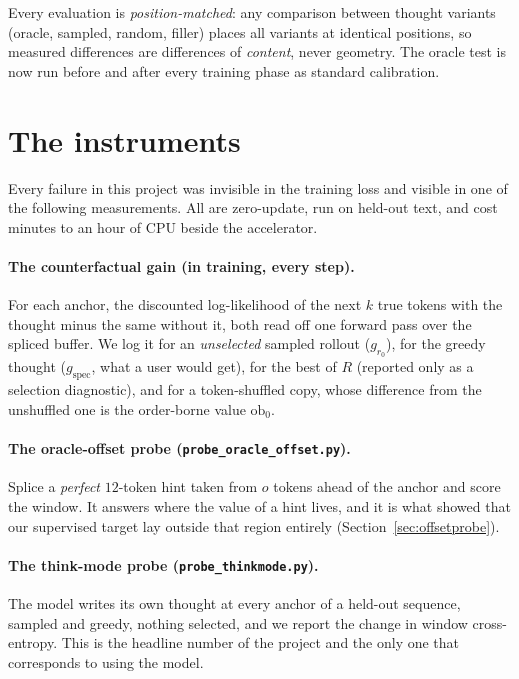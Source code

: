 \documentclass{article} %
\begin{document}
Every evaluation is \emph{position-matched}: any comparison between thought variants (oracle, sampled, random, filler) places all variants at identical positions, so measured differences are differences of \emph{content}, never geometry. The oracle test is now run before and after every training phase as standard calibration.

\section{The instruments}
\label{sec:instruments}

Every failure in this project was invisible in the training loss and visible in one of the following measurements. All are zero-update, run on held-out text, and cost minutes to an hour of CPU beside the accelerator.

\paragraph{The counterfactual gain (in training, every step).} For each anchor, the discounted log-likelihood of the next $k$ true tokens with the thought minus the same without it, both read off one forward pass over the spliced buffer. We log it for an \emph{unselected} sampled rollout ($g_{r_0}$), for the greedy thought ($g_{\mathrm{spec}}$, what a user would get), for the best of $R$ (reported only as a selection diagnostic), and for a token-shuffled copy, whose difference from the unshuffled one is the order-borne value $\mathrm{ob}_0$.

\paragraph{The oracle-offset probe (\texttt{probe\_oracle\_offset.py}).} Splice a \emph{perfect} $12$-token hint taken from $o$ tokens ahead of the anchor and score the window. It answers where the value of a hint lives, and it is what showed that our supervised target lay outside that region entirely (Section~\ref{sec:offsetprobe}).

\paragraph{The think-mode probe (\texttt{probe\_thinkmode.py}).} The model writes its own thought at every anchor of a held-out sequence, sampled and greedy, nothing selected, and we report the change in window cross-entropy. This is the headline number of the project and the only one that corresponds to using the model.
\end{document}
